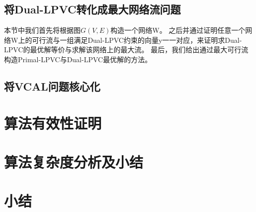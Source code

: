 \subsection{将Dual-LPVC转化成最大网络流问题}
本节中我们首先将根据图$G(V, E)$构造一个网络W。
之后并通过证明任意一个网络W上的可行流与一组满足Dual-LPVC约束的向量y一一对应，来证明求Dual-LPVC的最优解等价与求解该网络上的最大流。
最后，我们给出通过最大可行流构造Primal-LPVC与Dual-LPVC最优解的方法。
\subsection{将VCAL问题核心化}

\section{算法有效性证明}
\section{算法复杂度分析及小结}
\section{小结}